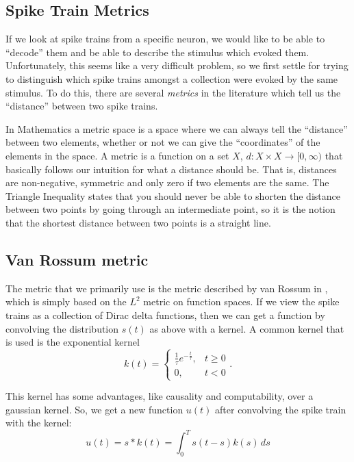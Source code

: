 \subsection{Spike Train Metrics}

If we look at spike trains from a specific neuron, we would like to be able to 
``decode'' them and be able to describe the stimulus which evoked them.  
Unfortunately, this seems like a very difficult problem, so we first settle for 
trying to distinguish which spike trains amongst a collection were evoked by 
the same stimulus.  To do this, there are several {\sl metrics} in the 
literature which tell us the ``distance'' between two spike trains.  

In Mathematics a metric space is a space where we can always tell the 
``distance'' between two elements, whether or not we can give the 
``coordinates'' of the elements in the space.  A metric is a function on a set 
$X$, $d: X\times X \rightarrow [0,\infty )$ that basically follows our 
intuition for what a distance should be. That is, distances are non-negative, 
symmetric and only zero if two elements are the same. The Triangle Inequality 
states that you should never be able to shorten the distance between two points 
by going through an intermediate point, so it is the notion that the shortest 
distance between two points is a straight line.


\subsection{Van Rossum metric}

The metric that we primarily use is the metric described by van Rossum in 
\cite{VanRossum2001a}, which is simply based on the $L^2$ metric on function 
spaces.  If we view the spike trains as a collection of Dirac delta functions, 
then we can get a function by convolving the distribution $s(t)$ as above with 
a kernel.  A common kernel that is used is the exponential kernel 
\begin{equation}
k(t) = \left\{ \begin{array}{ll}\frac{1}{\tau}e^{-\frac{t}{\tau}}, & t\geq 0 \\
0, & t<0\end{array} \right. .
\end{equation}

This kernel has some advantages, like causality and computability, over a 
gaussian kernel.  So, we get a new function $u(t)$ after convolving the spike 
train with the kernel:
\begin{equation}
u(t) = s*k(t) = \int_0^T s(t-s)k(s)\,ds
\end{equation}



